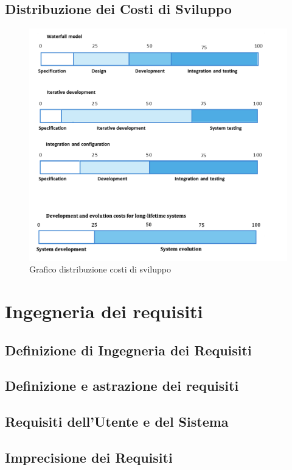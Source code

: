\documentclass{article}
\begin{document}
	\subsection{Distribuzione dei Costi di Sviluppo}
	\begin{figure}[h]
		\centering
		\includegraphics[scale=0.3]{10.dist_cost_svil.png}
		\caption{Grafico distribuzione costi di sviluppo}
		\label{fig:im-10}
	\end{figure}
	
	\section{Ingegneria dei requisiti}
	\subsection{Definizione di Ingegneria dei Requisiti}
	\subsection{Definizione e astrazione dei requisiti}
	\subsection{Requisiti dell’Utente e del Sistema}
	\subsection{Imprecisione dei Requisiti}
\end{document}
